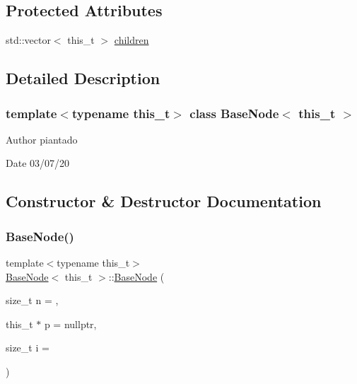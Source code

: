 \subsection*{Protected Attributes}
\begin{DoxyCompactItemize}
\item 
std\+::vector$<$ this\+\_\+t $>$ \hyperlink{class_base_node_af2f245862083d173c950fca048c03546}{children}
\end{DoxyCompactItemize}


\subsection{Detailed Description}
\subsubsection*{template$<$typename this\+\_\+t$>$\newline
class Base\+Node$<$ this\+\_\+t $>$}

\begin{DoxyAuthor}{Author}
piantado 
\end{DoxyAuthor}
\begin{DoxyDate}{Date}
03/07/20 
\end{DoxyDate}


\subsection{Constructor \& Destructor Documentation}
\mbox{\label{class_base_node_ae6af9c22d332e9c3158d9467f77b59f7}} 
\subsubsection{\texorpdfstring{Base\+Node()}{BaseNode()}\hspace{0.1cm}{\footnotesize\ttfamily [1/3]}}
{\footnotesize\ttfamily template$<$typename this\+\_\+t$>$ \\
\hyperlink{class_base_node}{Base\+Node}$<$ this\+\_\+t $>$\+::\hyperlink{class_base_node}{Base\+Node} (\begin{DoxyParamCaption}\item[{size\+\_\+t}]{n = {},  }\item[{this\+\_\+t $\ast$}]{p = {\ttfamily nullptr},  }\item[{size\+\_\+t}]{i = {} }\end{DoxyParamCaption})\hspace{0.3cm}{\ttfamily [inline]}}

